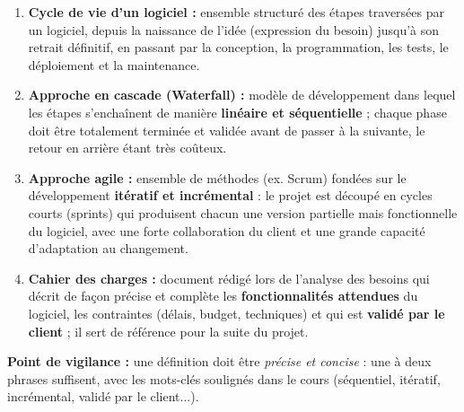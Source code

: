 \documentclass[11pt]{article}
\begin{document}
\begin{corrige}
\begin{enumerate}
    \item \textbf{Cycle de vie d'un logiciel :} ensemble structuré des étapes traversées par un logiciel, depuis la naissance de l'idée (expression du besoin) jusqu'à son retrait définitif, en passant par la conception, la programmation, les tests, le déploiement et la maintenance.
    \item \textbf{Approche en cascade (Waterfall) :} modèle de développement dans lequel les étapes s'enchaînent de manière \textbf{linéaire et séquentielle} ; chaque phase doit être totalement terminée et validée avant de passer à la suivante, le retour en arrière étant très coûteux.
    \item \textbf{Approche agile :} ensemble de méthodes (ex. Scrum) fondées sur le développement \textbf{itératif et incrémental} : le projet est découpé en cycles courts (sprints) qui produisent chacun une version partielle mais fonctionnelle du logiciel, avec une forte collaboration du client et une grande capacité d'adaptation au changement.
    \item \textbf{Cahier des charges :} document rédigé lors de l'analyse des besoins qui décrit de façon précise et complète les \textbf{fonctionnalités attendues} du logiciel, les contraintes (délais, budget, techniques) et qui est \textbf{validé par le client} ; il sert de référence pour la suite du projet.
\end{enumerate}
\textbf{Point de vigilance :} une définition doit être \emph{précise et concise} : une à deux phrases suffisent, avec les mots-clés soulignés dans le cours (séquentiel, itératif, incrémental, validé par le client...).
\end{corrige}
\end{document}
